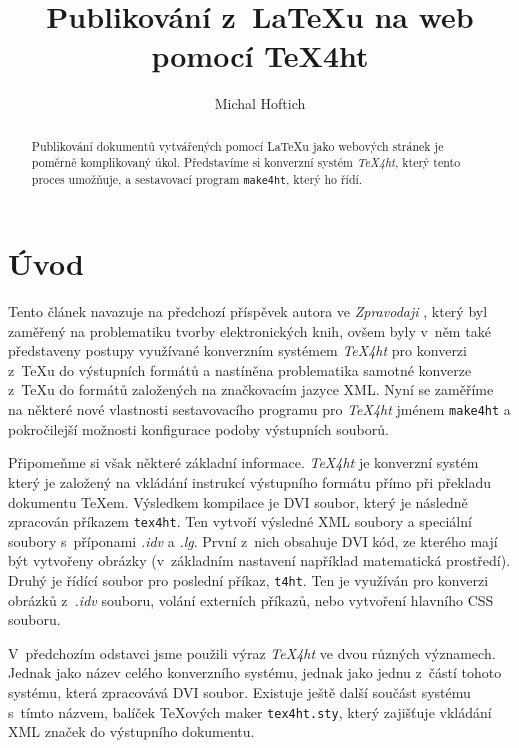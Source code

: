 \documentclass{csbulletin}
\newcommand\nazev[1]{\textit{#1}}
\newcommand\prikaz[1]{\texttt{#1}}
\begin{document}
\title{Publikování z~\LaTeX u na web pomocí TeX4ht}
\author{Michal Hoftich}
\maketitle

\begin{abstract}
Publikování dokumentů vytvářených pomocí \LaTeX u jako webových stránek je
poměrně komplikovaný úkol. Představíme si konverzní systém \nazev{TeX4ht}, který
tento proces umožňuje, a sestavovací program \prikaz{make4ht}, který ho řídí.
\end{abstract}

\section{Úvod}



Tento článek navazuje na předchozí příspěvek autora ve \nazev{Zpravodaji}
\parencite{hoftich:16}, který byl zaměřený na problematiku tvorby
elektronických knih, ovšem byly v~něm také
představeny postupy využívané konverzním systémem \nazev{TeX4ht} pro konverzi
z~\TeX u do výstupních formátů a nastíněna problematika samotné konverze z~\TeX u
do formátů založených na značkovacím jazyce XML. 
Nyní se zaměříme na některé nové vlastnosti sestavovacího programu pro \nazev{TeX4ht} jménem
\prikaz{make4ht} a pokročilejší možnosti konfigurace podoby výstupních souborů.

Připomeňme si však některé základní informace. \nazev{TeX4ht} je konverzní
systém který je založený na vkládání instrukcí výstupního formátu přímo při
překladu dokumentu \TeX em. Výsledkem kompilace je DVI soubor, který je
následně zpracován příkazem \prikaz{tex4ht}. Ten vytvoří výsledné XML soubory a
speciální soubory s~příponami \nazev{.idv} a \nazev{.lg}.
První z~nich obsahuje DVI kód, ze kterého mají být vytvořeny obrázky
(v~základním nastavení například matematická prostředí). Druhý je řídící soubor
pro poslední příkaz, \prikaz{t4ht}. Ten je využíván pro konverzi obrázků
z~\nazev{.idv} souboru, volání externích příkazů, nebo vytvoření hlavního CSS
souboru.

V~předchozím odstavci jsme použili výraz \nazev{TeX4ht} ve dvou různých
významech. Jednak jako název celého konverzního systému, jednak jako jednu
z~částí tohoto systému, která zpracovává DVI soubor. Existuje ještě další součást
systému s~tímto názvem, balíček \TeX ových maker \prikaz{tex4ht.sty}, který
zajišťuje vkládání XML značek do výstupního dokumentu.
\end{document}
